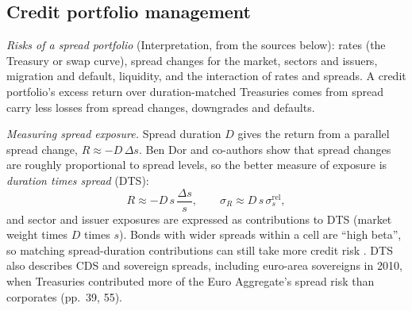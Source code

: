 \subsection{Credit portfolio management}

\begin{qfmethod}\label{meth:credit-spread-portfolio-risk}
 \emph{Risks of a spread portfolio} (Interpretation, from the sources below): rates (the Treasury or swap curve), spread changes for the market, sectors and issuers, migration and default, liquidity, and the interaction of rates and spreads. A credit portfolio's excess return over duration-matched Treasuries comes from spread carry less losses from spread changes, downgrades and defaults.

\emph{Measuring spread exposure.} Spread duration $D$ gives the return from a parallel spread change, $R\approx-D\,\Delta s$. Ben Dor and co-authors show that spread changes are roughly proportional to spread levels, so the better measure of exposure is \emph{duration times spread} (DTS):
\[
R\approx-D\,s\,\frac{\Delta s}{s},\qquad \sigma_R\approx D\,s\,\sigma^{\text{rel}}_s ,
\]
and sector and issuer exposures are expressed as contributions to DTS (market weight times $D$ times $s$). Bonds with wider spreads within a cell are ``high beta'', so matching spread-duration contributions can still take more credit risk \citep[pp.~3--4]{ben-dor-credit-portfolio-2012}. DTS also describes CDS and sovereign spreads, including euro-area sovereigns in 2010, when Treasuries contributed more of the Euro Aggregate's spread risk than corporates (pp.~39, 55).


\end{qfmethod}

